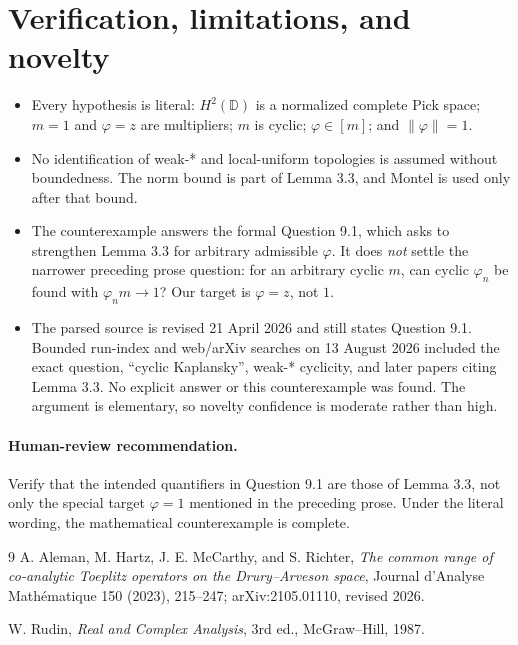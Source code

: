 \documentclass[11pt]{article}
\begin{document}
\section{Verification, limitations, and novelty}

\begin{itemize}
\item Every hypothesis is literal: $H^2(\mathbb D)$ is a normalized complete
Pick space; $m=1$ and $\varphi=z$ are multipliers; $m$ is cyclic;
$\varphi\in[m]$; and $\|\varphi\|=1$.
\item No identification of weak-* and local-uniform topologies is assumed
without boundedness.  The norm bound is part of Lemma 3.3, and Montel is used
only after that bound.
\item The counterexample answers the formal Question 9.1, which asks to
strengthen Lemma 3.3 for arbitrary admissible $\varphi$.  It does \emph{not}
settle the narrower preceding prose question: for an arbitrary cyclic $m$,
can cyclic $\varphi_n$ be found with $\varphi_nm\to1$?  Our target is
$\varphi=z$, not $1$.
\item The parsed source is revised 21 April 2026 and still states Question
9.1.  Bounded run-index and web/arXiv searches on 13 August 2026 included the
exact question, ``cyclic Kaplansky'', weak-* cyclicity, and later papers citing
Lemma 3.3.  No explicit answer or this counterexample was found.  The argument
is elementary, so novelty confidence is moderate rather than high.
\end{itemize}

\paragraph{Human-review recommendation.}
Verify that the intended quantifiers in Question 9.1 are those of Lemma 3.3,
not only the special target $\varphi=1$ mentioned in the preceding prose.
Under the literal wording, the mathematical counterexample is complete.

\begin{thebibliography}{9}
A. Aleman, M. Hartz, J. E. McCarthy, and S. Richter,
\emph{The common range of co-analytic Toeplitz operators on the
Drury--Arveson space}, Journal d'Analyse Math\'ematique 150 (2023), 215--247;
arXiv:2105.01110, revised 2026.

W. Rudin, \emph{Real and Complex Analysis}, 3rd ed., McGraw--Hill, 1987.
\end{thebibliography}
\end{document}
